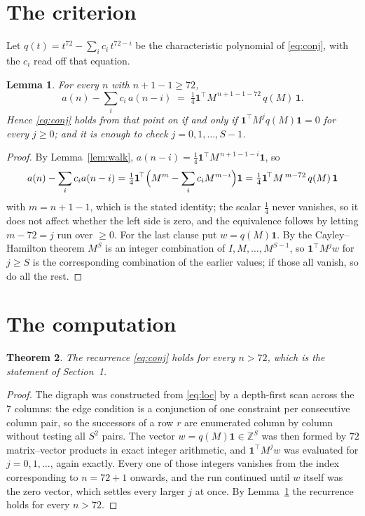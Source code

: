 \documentclass[11pt,a4paper]{article}
\theoremstyle{plain}
\newtheorem{theorem}{Theorem}
\newtheorem{lemma}[theorem]{Lemma}
\theoremstyle{definition}
\begin{document}
\section{The criterion}

Let $q(t)=t^{72}-\sum_i c_i\,t^{72-i}$ be the characteristic polynomial of
\eqref{eq:conj}, with the $c_i$ read off that equation.

\begin{lemma}\label{lem:crit}
For every $n$ with $n+1-1\ge72$,
\[
a(n)-\sum_i c_i\,a(n-i)\;=\;\tfrac1{4}\mathbf{1}^{\!\top}M^{\,n+1-1-72}\,q(M)\,\mathbf{1} .
\]
Hence \eqref{eq:conj} holds from that point on if and only if
$\mathbf{1}^{\!\top}M^{j}q(M)\mathbf{1}=0$ for every $j\ge0$; and it is enough to check
$j=0,1,\dots,S-1$.
\end{lemma}

\begin{proof}
By Lemma~\ref{lem:walk}, $a(n-i)=\tfrac1{4}\mathbf{1}^{\!\top}M^{\,n+1-1-i}\mathbf{1}$, so
\[
a(n)-\sum_i c_i a(n-i)
=\tfrac1{4}\mathbf{1}^{\!\top}\Bigl(M^{m}-\sum_i c_i M^{m-i}\Bigr)\mathbf{1}
=\tfrac1{4}\mathbf{1}^{\!\top}M^{\,m-72}\,q(M)\,\mathbf{1}
\]
with $m=n+1-1$, which is the stated identity; the scalar $\tfrac1{4}$ never vanishes, so it does not affect whether the left side is zero, and the equivalence follows by letting
$m-72=j$ run over $\ge0$. For the last clause put $w=q(M)\mathbf{1}$. By the
Cayley--Hamilton theorem $M^{S}$ is an integer combination of $I,M,\dots,M^{S-1}$, so
$\mathbf{1}^{\!\top}M^{j}w$ for $j\ge S$ is the corresponding combination of the earlier
values; if those all vanish, so do all the rest.
\end{proof}

\section{The computation}

\begin{theorem}
The recurrence \eqref{eq:conj} holds for every $n>72$, which is the statement of
Section~1.
\end{theorem}

\begin{proof}
The digraph was constructed from \eqref{eq:loc} by a depth-first scan across the $7$
columns: the edge condition is a conjunction of one constraint per consecutive column
pair, so the successors of a row $r$ are enumerated column by column without testing all
$S^2$ pairs. The vector $w=q(M)\mathbf{1}\in\mathbb{Z}^{S}$ was then formed by $72$
matrix--vector products in exact integer arithmetic, and $\mathbf{1}^{\!\top}M^{j}w$ was
evaluated for $j=0,1,\dots$, again exactly. Every one of those integers vanishes from the
index corresponding to $n=72+1$ onwards, and the run continued until $w$ itself was the
zero vector, which settles every larger $j$ at once. By Lemma~\ref{lem:crit} the recurrence
holds for every $n>72$.
\end{proof}
\end{document}
